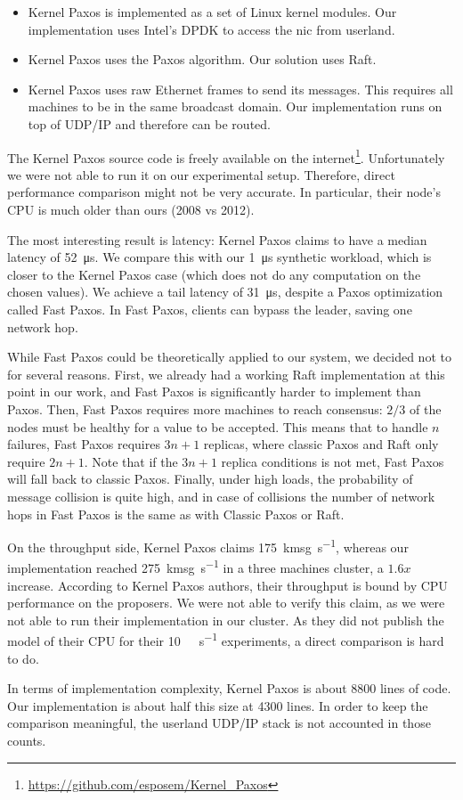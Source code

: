 \begin{itemize}
    \item Kernel Paxos is implemented as a set of Linux kernel modules.
        Our implementation uses Intel's DPDK\cite{dpdk} to access the \gls{nic} from userland.
    \item Kernel Paxos uses the Paxos algorithm.
        Our solution uses Raft.
    \item Kernel Paxos uses raw Ethernet frames to send its messages.
        This requires all machines to be in the same broadcast domain.
        Our implementation runs on top of UDP/IP and therefore can be routed.
\end{itemize}

The Kernel Paxos source code is freely available on the internet\footnote{\url{https://github.com/esposem/Kernel_Paxos}}.
Unfortunately we were not able to run it on our experimental setup.
Therefore, direct performance comparison might not be very accurate.
In particular, their node's CPU is much older than ours (2008 vs 2012).

The most interesting result is latency: Kernel Paxos claims to have a median latency of \SI{52}{\micro\second}.
We compare this with our \SI{1}{\micro\second} synthetic workload, which is closer to the Kernel Paxos case (which does not do any computation on the chosen values).
We achieve a tail latency of \SI{31}{\micro\second}, despite a Paxos optimization called Fast Paxos\cite{lamport2006fast}.
In Fast Paxos, clients can bypass the leader, saving one network hop.

While Fast Paxos could be theoretically applied to our system, we decided not to for several reasons.
First, we already had a working Raft implementation at this point in our work, and Fast Paxos is significantly harder to implement than Paxos.
Then, Fast Paxos requires more machines to reach consensus: $2/3$ of the nodes must be healthy for a value to be accepted.
This means that to handle $n$ failures, Fast Paxos requires $3n + 1$ replicas, where classic Paxos and Raft only require $2n + 1$.
Note that if the $3n + 1$ replica conditions is not met, Fast Paxos will fall back to classic Paxos.
Finally, under high loads, the probability of message collision is quite high, and in case of collisions the number of network hops in Fast Paxos is the same as with Classic Paxos or Raft.

On the throughput side, Kernel Paxos claims \SI{175}{\kilo msg\per\second}, whereas our implementation reached \SI{275}{\kilo msg\per\second} in a three machines cluster, a $1.6x$ increase.
According to Kernel Paxos authors, their throughput is bound by CPU performance on the proposers.
We were not able to verify this claim, as we were not able to run their implementation in our cluster.
As they did not publish the model of their CPU for their \SI{10}{\giga\bit\per\second} experiments, a direct comparison is hard to do.

In terms of implementation complexity, Kernel Paxos is about 8800 lines of code.
Our implementation is about half this size at 4300 lines.
In order to keep the comparison meaningful, the userland UDP/IP stack is not accounted in those counts.
